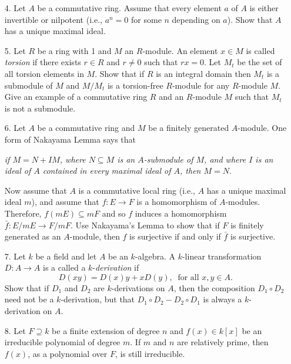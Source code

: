 \documentclass{article}
\begin{document}
\begin{Large}
\begin{itemize}
\item[4.]  Let $ A$ be a commutative ring. Assume that every
element $a$ of $A$ is either invertible or nilpotent (i.e., $a^n=0$ for some $n$
depending on $a$). Show that $ A$ has a unique maximal ideal.

\item[5.] Let $ R$ be a ring with 1 and $M$ an $R$-module. An element 
$x \in M $ is called {\em torsion} if there exists $ r \in R $ and $ r \neq 0 $ such that $ r x = 0 $. Let $ M_{t}$ be the set of all torsion elements in $M$. 
Show that if $ R $ is an integral domain then $ M_{t}$ is a submodule 
of $ M$ and $ M/M_{t}$ is a torsion-free $ R$-module for any $ R$-module $ M$.
Give an example of a commutative ring $R$ and an $R$-module $ M$ such that $ M_{t}$ is not a 
submodule.

\clearpage

\item[6.] Let $A$ be a commutative ring and $M$ be a finitely generated
$A$-module. One form of Nakayama Lemma says that 

{\sl if $M=N+IM$,
where $N\subseteq M$ is an $A$-submodule of $M$, and where $I$ is an
ideal of $A$ contained in every maximal ideal of $A$, then $M=N$}.

Now assume that $A$ is a
commutative local ring (i.e., $A$ has a unique maximal ideal $m$), 
and assume that $f: E\rightarrow F$ is a homomorphism of $A$-modules. 
Therefore, 
$f(mE)\subseteq mF$ and so $f$ induces a homomorphism 
$\bar{f}: E/mE\rightarrow F/mF$. 
Use Nakayama's Lemma to show that if $F$ is finitely generated 
as an $A$-module, then 
$f$ is surjective if and only if $ \bar{f}$ is surjective. 

\item[7.]   Let $ k$ be a field  and let $A$ be an $k$-algebra.
A $k$-linear transformation $D: A\rightarrow A$ is a called a
$k$-{\em derivation} if
\[ D(xy)=D(x)y+xD(y),\  \text{ for all } x , y \in A.\]
Show that if $D_1$ and $D_2$ are $k$-derivations on $A$,  then the
composition $D_1\circ D_2 $ need not be a $k$-derivation, but that 
$ D_1\circ
D_2-D_2\circ D_1$ is always a $k$-derivation on $A$.

\item[8.] Let $ F\supseteq k$ be a finite extension of degree $n$ and $f(x)\in
k[x]$ be an irreducible polynomial of degree $m$. If $m$ and $n$ are relatively prime,
then $ f(x) $, as a polynomial over $F$,  is still irreducible.


\end{itemize}
\end{Large}
\end{document}
